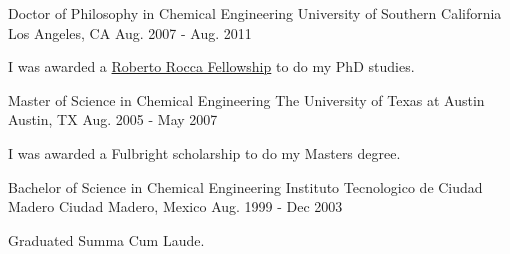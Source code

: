 

\begin{cventries}

  \cventry
    {Doctor of Philosophy in Chemical Engineering} %
    {University of Southern California} %
    {Los Angeles, CA} %
    {Aug. 2007 - Aug. 2011} %
    {
      \begin{cvitems} %
        \item  I was awarded a {\href{http://www.robertorocca.org/en/fellowships/fellows07.aspx}{Roberto Rocca Fellowship}} to do my PhD studies.
      \end{cvitems}
    }

  \cventry
      {Master of Science in Chemical Engineering} %
      {The University of Texas at Austin} %
      {Austin, TX} %
      {Aug. 2005 - May 2007} %
      {
        \begin{cvitems} %
          \item  I was awarded a Fulbright scholarship to do my Masters degree.
        \end{cvitems}
      }

  \cventry
      {Bachelor of Science in Chemical Engineering} %
      {Instituto Tecnologico de Ciudad Madero} %
      {Ciudad Madero, Mexico} %
      {Aug. 1999 - Dec 2003} %
      {
       \begin{cvitems} %
          \item  Graduated Summa Cum Laude.
        \end{cvitems}
      }




\end{cventries}
